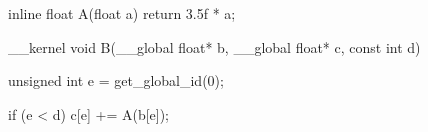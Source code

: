 inline float A(float a) {
return 3.5f * a;
}

__kernel void B(__global float* b, __global float* c, const int d) {
unsigned int e = get_global_id(0);

if (e < d) {
c[e] += A(b[e]);
}
}
